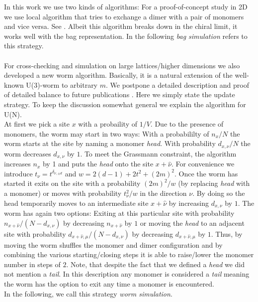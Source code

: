 \documentclass{PoS}
\begin{document}
In this work we use two kinds of algorithms: For a proof-of-concept study in 2D we use local algorithm that tries to exchange a dimer with a pair of monomers and vice versa. See \cite{Karsch:1988zx}. Albeit this algorithm breaks down in the chiral limit, it works well with the bag representation. In the following \textit{bag simulation} refers to this strategy.\\
\\For cross-checking and simulation on large lattices/higher dimensions we also developed a new worm algorithm. Basically, it is a natural extension of the well-known U(3)-worm \cite{Adams:2003cca} to arbitrary $m$. We postpone a detailed description and proof of detailed balance to future publications \cite{Orasch:2019_1, Orasch:2019_2}. Here we simply state the update strategy. To keep the discussion somewhat general we explain the algorithm for U(N).\\
At first we pick a site $x$ with a probaility of $1/V$. Due to the presence of monomers, the worm may start in two ways: With a probabililty of $n_x/N$ the worm starts at the site by naming a monomer \textit{head}. With probability $d_{x,\nu}/N$ the worm decreases $d_{x,\nu}$ by $1$. To meet the Grassmann constraint, the algorithm increases $n_x$ by 1 and puts the \textit{head} onto the site $x+\hat{\nu}$. For convenience we introduce $t_{\nu} = t^{\delta_{\nu,\pm d}}$ and $w = 2(d-1) + 2t^2 + (2m)^2$. Once the worm has started it exits on the site with a probability $(2m)^2/w$ (by replacing \textit{head} with a monomer) or moves with probability $t^2_{\nu}/w$ in the direction $\nu$. By doing so the head temporarily moves to an intermediate site $x+\hat{\nu}$ by increasing $d_{x,\nu}$ by $1$. The worm has again two options: Exiting at this particular site with probability $n_{x+\hat{\nu}}/(N-d_{x,\nu})$ by decreasing $n_{x+\hat{\nu}}$ by $1$ or moving the \textit{head} to an adjacent site with probability $d_{x+\hat{\nu}, \mu}/(N-d_{x,\nu})$ by decreasing $d_{x+\hat{\nu}, \mu}$ by $1$. Thus, by moving the worm shuffles the monomer and dimer configuration and by combining the various starting/closing steps it is able to raise/lower the monomer number in steps of $2$. Note, that despite the fact that we defined a \textit{head} we did not mention a \textit{tail}. In this description any monomer is considered a \textit{tail} meaning the worm has the option to exit any time a monomer is encountered.\\
In the following, we call this strategy \textit{worm simulation}.
\end{document}
